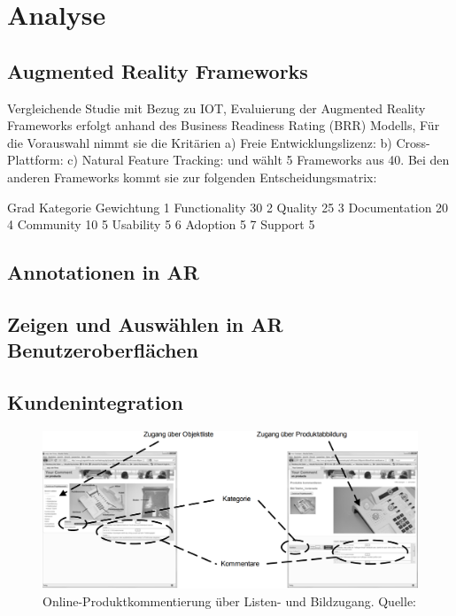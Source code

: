 \chapter{Analyse}

\section{Augmented Reality Frameworks}

\cite{Poth2017} Vergleichende Studie mit Bezug zu IOT, Evaluierung der Augmented Reality Frameworks erfolgt anhand des Business Readiness Rating (BRR) Modells,
Für die Vorauswahl nimmt sie die Kritärien  a) Freie Entwicklungslizenz: b) Cross-Plattform: c) Natural Feature Tracking: und wählt 5 Frameworks aus 40. 
Bei den anderen Frameworks kommt sie zur folgenden Entscheidungsmatrix:  

Grad Kategorie Gewichtung
1 Functionality 30 %
2 Quality 25 %
3 Documentation 20 %
4 Community 10 %
5 Usability 5 %
6 Adoption 5 %
7 Support 5 %




\section{Annotationen in AR}

\cite{Brandenburg2019}

\section{Zeigen und Auswählen in AR Benutzeroberflächen}


\section{Kundenintegration}


\begin{figure}[H]
	\centering
	\includegraphics[width=1.0\textwidth]{resources/analyse/IPI_Vergleich_Listen_BildAnnotationeAnsicht.png}
	\caption{Online-Produktkommentierung über Listen- und Bildzugang. Quelle: \cite[S.~7]{Kirschner2011}}
	\label{img:ipi_list_image}
\end{figure}

